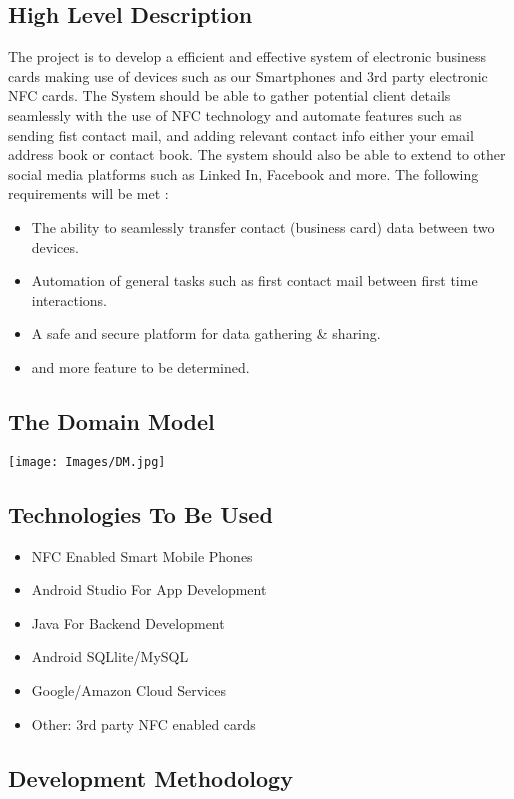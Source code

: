 \documentclass[11pt]{article}
\begin{document}
\subsection{High Level Description}
The project is to develop a efficient and effective system of electronic business cards making use of devices such as our Smartphones and 3rd party electronic NFC cards. The System should be able to gather potential client details seamlessly with the use of NFC technology and automate features such as sending fist contact mail, and adding relevant contact info either your email address book or contact book. The system should also be able to extend to other social media platforms such as Linked In, Facebook and more.
\newline
\newline The following requirements will be met : 
\begin{itemize}
\item The ability to seamlessly transfer contact (business card) data  between two devices.
\item Automation of general tasks such as first contact mail between first time interactions.
\item A safe and secure platform for data gathering \& sharing.
\item and more feature to be determined.
\end{itemize}

\subsection{The Domain Model}
\texttt{[image: Images/DM.jpg]}
           

\subsection{Technologies To Be Used}
\begin{itemize}
\item NFC Enabled Smart Mobile Phones
\item Android Studio For App Development
\item Java For Backend Development
\item Android SQLlite/MySQL
\item Google/Amazon Cloud Services
\item Other: 3rd party NFC enabled cards 
\end{itemize}
\subsection{Development Methodology}
\end{document}
